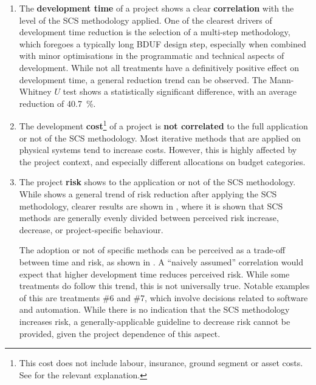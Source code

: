\documentclass[a4paper,nobib,justified,final]{tufte-book}
\begin{document}
\begin{enumerate}[itemsep=-1pt]
	\item The \textbf{development time} of a project shows a clear \textbf{correlation} with the level of the \acs{SCS} methodology applied. One of the clearest drivers of development time reduction is the selection of a multi-step methodology, which foregoes a typically long \acs{BDUF} design step, especially when combined with minor optimisations in the programmatic and technical aspects of development. While not all treatments have a definitively positive effect on development time, a general reduction trend can be observed. The Mann-Whitney \( U \) test shows a statistically significant difference, with an average reduction of \qty{40.7}{\percent}.
	\item The development \textbf{cost}\footnote{This cost does not include labour, insurance, ground segment or asset costs. See  for the relevant explanation.} of a project is \textbf{not correlated} to the full application or not of the \acs{SCS} methodology. Most iterative methods that are applied on physical systems tend to increase costs. However, this is highly affected by the project context, and especially different allocations on budget categories.
	\item The project \textbf{risk} shows  to the application or not of the \acs{SCS} methodology. While  shows a general trend of risk reduction after applying the \acs{SCS} methodology, clearer results are shown in , where it is shown that \acs{SCS} methods are generally evenly divided between perceived risk increase, decrease, or project-specific behaviour.

	The adoption or not of specific methods can be perceived as a trade-off between time and risk, as shown in .
	A ``naively assumed'' correlation would expect that higher development time reduces perceived risk. While some treatments do follow this trend, this is not universally true. Notable examples of this are treatments \#6 and \#7, which involve decisions related to software and automation.
	While there is no indication that the \acs{SCS} methodology increases risk, a generally-applicable guideline to decrease risk cannot be provided, given the project dependence of this aspect.
\end{enumerate}
\end{document}
